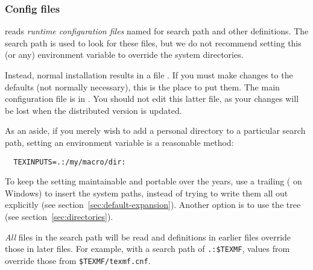 \documentclass{article}
\begin{document}
\subsubsection{Config files}

\KPS{} reads \emph{runtime configuration files} named 
for search path and other definitions.  The search path
 is used to look for these files, but we do not
recommend setting this (or any) environment variable to override the
system directories.

Instead, normal installation results in a file
.  If you must make changes to the defaults
(not normally necessary), this is the place to put them.  The main
configuration file is in .
You should not edit this latter file, as your changes will be lost when
the distributed version is updated.

As an aside, if you merely wish to add a personal directory to a
particular search path, setting an environment variable is a reasonable
method:
\begin{verbatim}
  TEXINPUTS=.:/my/macro/dir:
\end{verbatim}
To keep the setting maintainable and portable over the years, use a
trailing \samp{:} (\samp{;} on Windows) to insert the system paths,
instead of trying to write them all out explicitly (see
section~\ref{sec:default-expansion}). Another option is to use the
 tree (see section~\ref{sec:directories}).

\emph{All}  files in the search path will be read and
definitions in earlier files override those in later files.  For
example, with a search path of \verb|.:$TEXMF|, values from
 override those from \verb|$TEXMF/texmf.cnf|.
\end{document}
